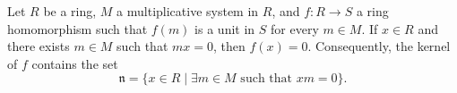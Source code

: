Let $R$ be a ring, $M$ a multiplicative system in $R$, and $f: R \to S$ a ring homomorphism such that $f(m)$ is a unit in $S$ for every $m \in M$. If $x \in R$ and there exists $m \in M$ such that $mx = 0$, then $f(x) = 0$. Consequently, the kernel of $f$ contains the set
$$
\mathfrak{n} = \{ x \in R \mid \exists m \in M \text{ such that } xm = 0 \}.
$$
